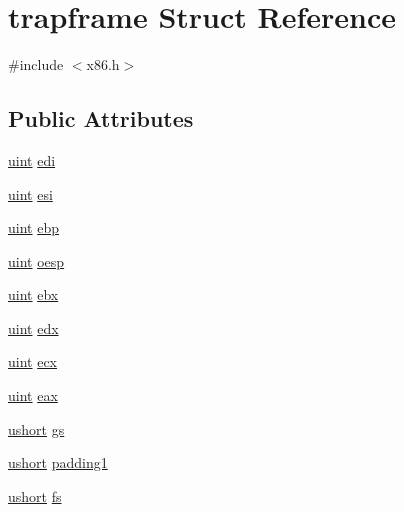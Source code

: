 \hypertarget{structtrapframe}{}\section{trapframe Struct Reference}
\label{structtrapframe}


{\ttfamily \#include $<$x86.\+h$>$}

\subsection*{Public Attributes}
\begin{DoxyCompactItemize}
\item 
\hyperlink{custom__types_8h_a91ad9478d81a7aaf2593e8d9c3d06a14}{uint} \hyperlink{structtrapframe_ad20959553b558987a0d475b6367c87d0}{edi}
\item 
\hyperlink{custom__types_8h_a91ad9478d81a7aaf2593e8d9c3d06a14}{uint} \hyperlink{structtrapframe_a11cbc20a968f2ce7a9b71590a709bb46}{esi}
\item 
\hyperlink{custom__types_8h_a91ad9478d81a7aaf2593e8d9c3d06a14}{uint} \hyperlink{structtrapframe_a258f414f983f95f6799372d548fbd6d3}{ebp}
\item 
\hyperlink{custom__types_8h_a91ad9478d81a7aaf2593e8d9c3d06a14}{uint} \hyperlink{structtrapframe_a8466e7bcbbbe2d19fbe7f4fe0daa29fb}{oesp}
\item 
\hyperlink{custom__types_8h_a91ad9478d81a7aaf2593e8d9c3d06a14}{uint} \hyperlink{structtrapframe_a0f93026966ea52a69a94870fb394ba04}{ebx}
\item 
\hyperlink{custom__types_8h_a91ad9478d81a7aaf2593e8d9c3d06a14}{uint} \hyperlink{structtrapframe_a62585fbda8434a03de564611b89c02ad}{edx}
\item 
\hyperlink{custom__types_8h_a91ad9478d81a7aaf2593e8d9c3d06a14}{uint} \hyperlink{structtrapframe_ad42fe2bbc83c7fe778f0127ac038efa3}{ecx}
\item 
\hyperlink{custom__types_8h_a91ad9478d81a7aaf2593e8d9c3d06a14}{uint} \hyperlink{structtrapframe_ab1dd3a10936b61129d7395c3a21bc2fe}{eax}
\item 
\hyperlink{custom__types_8h_ab95f123a6c9bcfee6a343170ef8c5f69}{ushort} \hyperlink{structtrapframe_a3df62e3ed00405cbaaa4d72902c617da}{gs}
\item 
\hyperlink{custom__types_8h_ab95f123a6c9bcfee6a343170ef8c5f69}{ushort} \hyperlink{structtrapframe_a84a5fbe43d7f11df983d97c80aabb454}{padding1}
\item 
\hyperlink{custom__types_8h_ab95f123a6c9bcfee6a343170ef8c5f69}{ushort} \hyperlink{structtrapframe_a4791a272cca7213d324e59db2d9d0b71}{fs}

\end{DoxyCompactItemize}
